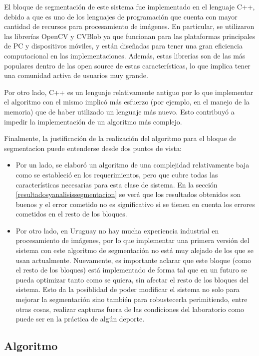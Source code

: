 El bloque de segmentación de este sistema fue implementado en el lenguaje C++, debido a que es uno de los lenguajes de programación que cuenta con mayor cantidad de recursos para procesamiento de imágenes. En particular, se utilizaron las librerías OpenCV\cite{opencv} y CVBlob\cite{cvblob} ya que funcionan para las plataformas principales de PC y dispositivos móviles, y están diseñadas para tener una gran eficiencia computacional en las implementaciones. Además, estas librerías son de las más populares dentro de las open source de estas características, lo que implica tener una comunidad activa de usuarios muy grande.

Por otro lado, C++ es un lenguaje relativamente antiguo por lo que implementar el algoritmo con el mismo implicó más esfuerzo (por ejemplo, en el manejo de la memoria) que de haber utilizado un lenguaje más nuevo. Esto contribuyó a impedir la implementación de un algoritmo más complejo.

Finalmente, la justificación de la realización del algoritmo para el bloque de segmentacíon puede entenderse desde dos puntos de vista: 
\begin{itemize}
 \item Por un lado, se elaboró un algoritmo de una complejidad relativamente baja como se estableció en los requerimientos, pero que cubre todas las características necesarias para esta clase de sistema. En la sección \ref{resultadosyanalisissegmentacion} se verá que los resultados obtenidos son buenos y el error cometido no es significativo si se tienen en cuenta los errores cometidos en el resto de los bloques.
 \item Por otro lado, en Uruguay no hay mucha experiencia industrial en procesamiento de imágenes, por lo que implementar una primera versión del sistema con este algoritmo de segmentación no está muy alejado de los que se usan actualmente. Nuevamente, es importante aclarar que este bloque (como el resto de los bloques) está implementado de forma tal que en un futuro se pueda optimizar tanto como se quiera, sin afectar el resto de los bloques del sistema. Esto da la posiblidad de poder modificar el sistema no solo para mejorar la segmentación sino también para robustecerla perimitiendo, entre otras cosas, realizar capturas fuera de las condiciones del laboratorio como puede ser en la práctica de algún deporte.
\end{itemize}


\subsection{Algoritmo}

